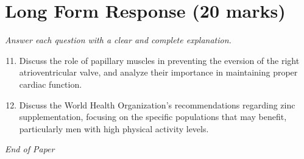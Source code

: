 \documentclass[12pt]{article}
\begin{document}
\section*{Long Form Response (20 marks)}
\textit{Answer each question with a clear and complete explanation.}
\begin{enumerate}[label=\arabic*.]
\setcounter{enumi}{10}
\item Discuss the role of papillary muscles in preventing the eversion of the right atrioventricular valve, and analyze their importance in maintaining proper cardiac function.
\item Discuss the World Health Organization's recommendations regarding zinc supplementation, focusing on the specific populations that may benefit, particularly men with high physical activity levels.
\end{enumerate}

\vfill
\noindent\textit{End of Paper}
\end{document}
